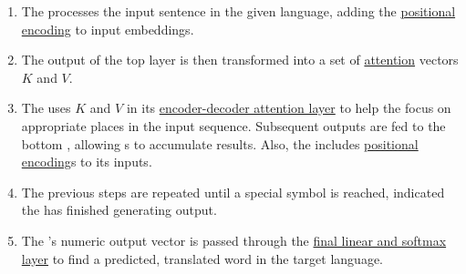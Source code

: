 \begin{enumerate}
    \item The  processes the input sentence in the given language, adding the \hyperref[sec:PosEncodings]{positional encoding} to input embeddings.
    
    \item The output of the top  layer is then transformed into a set of \hyperref[sec:AttentionMechanism]{attention} vectors $K$ and $V$.
    
    \item The  uses $K$ and $V$ in its \hyperref[sec:EncoderDecoderAttention]{encoder-decoder attention layer} to help the  focus on appropriate places in the input sequence. Subsequent outputs are fed to the bottom , allowing s to accumulate results. Also, the  includes \hyperref[sec:PosEncodings]{positional encoding}s to its inputs. 
    
    \item The previous steps are repeated until a special symbol is reached, indicated the  has finished generating output.
    
    \item The 's numeric output vector is passed through the \hyperref[sec:TransformerFinalLayer]{final linear and softmax layer} to find a predicted, translated word in the target language. 
    
\end{enumerate}

